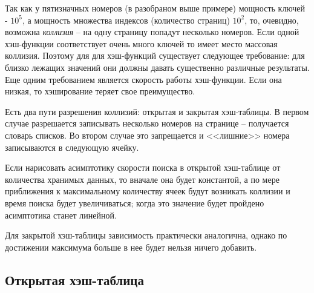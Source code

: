 Так как у пятизначных номеров (в разобраном выше примере) мощность ключей - $10^5$, а мощность множества индексов (количество страниц) $10^2$, то, очевидно, возможна \emph{коллизия} -- на одну страницу попадут несколько номеров.
Если одной хэш-функции соответствует очень много ключей то имеет место массовая коллизия. Поэтому для для хэш-функций существует следующее требование: для близко лежащих значений они должны давать существенно различные результаты. Еще одним требованием является скорость работы хэш-функции. Если она низкая, то хэширование теряет свое преимущество. 

Есть два пути разрешения коллизий: открытая и закрытая хэш-таблицы. В первом случае разрешается записывать несколько номеров на странице -- получается словарь списков. Во втором случае это запрещается и <<лишние>> номера записываются в следующую ячейку. 

Если нарисовать асимптотику скорости поиска в открытой хэш-таблице от количества хранимых данных, то вначале она будет константой, а по мере приближения к максимальному количеству ячеек будут возникать коллизии и время поиска будет увеличиваться; когда это значение будет пройдено асимптотика станет линейной.  

Для закрытой хэш-таблицы зависимость практически аналогична, однако по достижении максимума больше в нее будет нельзя ничего добавить.

\subsection*{Открытая хэш-таблица}

